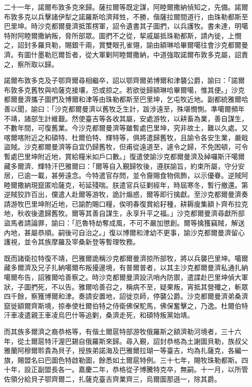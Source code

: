 \begin{pinyinscope}
二十一年，諾爾布敦多克來歸。薩拉爾等既定謀，阿睦爾撒納偵知之，先備。諾爾布敦多克以兵擊諸伊犁之諾羅斯哈濟拜甡，不勝，偕薩拉爾間道行，由珠勒都斯至巴里坤。時沙克都爾曼濟抵策楞軍，詔令遺書其子圖捫，以兵護牧。書未達，明噶特附阿睦爾撒納叛，脅所部眾。圖捫不之從，挈戚屬抵珠勒都斯，請內徙，上憫之，詔封多羅貝勒，賜銀千兩，賞雙眼孔雀翎，諭由額琳哈畢爾噶往會沙克都爾曼濟。有圖什墨勒厄爾哲者，從大軍剿阿睦爾撒納，中道強取諾爾布敦多克屬，詔責之，察所取以歸。

諾爾布敦多克及子鄂齊爾尋相繼卒，詔以鄂齊爾弟博爾和津襲公爵，諭曰：「諾爾布敦多克舊牧與哈薩克接壤，恐或掠之。若欲徙歸額琳哈畢爾噶，惟其便。」沙克都爾曼濟攜子圖捫及博爾和津等由珠勒都斯至巴里坤，乞屯牧近地。副都統雅爾哈善以聞，諭曰：「沙克都爾曼濟以舊牧乏生計，跋涉遠至，殊堪憫惻。準噶爾頻年不靖，諸部生計維艱。然使臺吉等各收其屬，安處游牧，以耕畜為業，善自謀生，不數年間，可復舊業。今沙克都爾曼濟等雖暫處巴里坤，究非故土，難以久處。又喀爾喀附近之和碩特、杜爾伯特、輝特等，俱將遣歸舊牧，且諭令各安生業，嚴戢盜賊。沙克都爾曼濟等自宜仍歸舊牧，但甫從遠道至，遽令之歸，不免困頓，可令暫處巴里坤附近地，賞給糧米如戶口數。」復遣使諭沙克都爾曼濟及綽囉斯汗噶爾藏多爾濟、輝特汗巴雅爾曰：「爾等自入覲歸牧後，遵朕諭旨，約束所屬，守分安居，已逾一載，甚勞遠念。今特遣官存問，並令齎賜食物佩飾，以示優眷。逆賊阿睦爾撒納現竄匿哈薩克，茍延殘喘。朕遣官兵征剿經年，時屆寒冬，暫行撤還。第逆賊狡詐百出，儻遣人赴爾等游牧，詭計煽惑，爾等即行擒獻。至沙克都爾曼濟奏請游牧巴里坤附近地，已諭酌賜口糧，俟明春復賞給耔種，耕耨廋集額卜齊布拉克地，秋收後遣歸舊牧。爾等其善自謀生，永享升平之福。」沙克都爾曼濟尋獻所部盜馬者請論罪，諭曰：「厄魯特劫奪成風，不可不嚴加懲創。爾等擒獲竊賊，解送內地，甚屬恭順。嗣後可自治之。」復以博爾和津幼不更事，諭沙克都爾曼濟留心護視，並令其族摩羅及宰桑新登等暫理牧務。

既而諸衛拉特復不靖，巴雅爾詭稱沙克都爾曼濟掠所部牧，將以兵襲巴里坤。噶爾藏多爾濟及兄子扎納噶爾布叛擾邊境，有普爾普者，以其主沙克都爾曼濟私通扎納噶爾布告，詔雅爾哈善察之。時沙克都爾曼濟設汛哨內防禦，遣諜赴巴里坤偵大軍狀，子圖捫死，不以告。雅爾哈善召之，稱病不至，疑果叛，宵抵其營殲之，斬眾四千餘，察獲博爾和津。奏請安置地，詔徙京師，停襲公爵。沙克都爾曼濟弟桑濟竄徙額爾齊斯境，掠奉使杜爾伯特之侍衛佛保駝馬，佛保奮擊之，乃逸。杜爾伯特汗車凌遣親王車凌烏巴什等追剿，桑濟走死，和碩特叛黨始靖。

而其族多爾濟之裔恭格等，有偕土爾扈特部游牧俄羅斯之額濟勒河境者，三十六年，從土爾扈特汗渥巴錫自俄羅斯來歸。尋入覲，詔封恭格為土謝圖貝勒，族叔父雅蘭阿穆爾聆貴為貝子，授族弟諾海及巴雅爾拉瑚一等臺吉，均為扎薩克，各編一旗，賜盟名曰巴圖色特啟勒圖，餘悉如土爾扈特例。三十七年，賜牧珠勒都斯。四十年，設正副盟長各一。嘉慶二年，恭格從子博騰特克卒，無嗣。十一月，以所管佐領分給貝子鄂齊爾二，扎薩克臺吉齊業齊三，烏爾圖那遜一，除其爵。


\end{pinyinscope}
